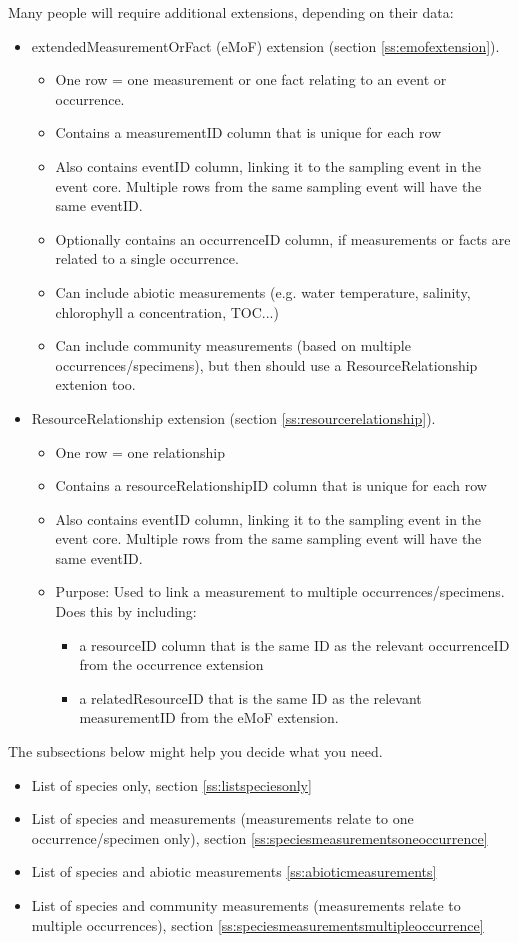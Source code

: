 \documentclass[a4paper,english, 11pt]{article}
\begin{document}
Many people will require additional extensions, depending on their data:

\begin{itemize}
\item extendedMeasurementOrFact (eMoF) extension (section \ref{ss:emofextension}).
\begin{itemize}
\item One row = one measurement or one fact relating to an event or occurrence.
\item Contains a measurementID column that is unique for each row
\item Also contains eventID column, linking it to the sampling event in the event core. Multiple rows from the same sampling event will have the same eventID.
\item Optionally contains an occurrenceID column, if measurements or facts are related to a single occurrence.
\item Can include abiotic measurements (e.g. water temperature, salinity, chlorophyll a concentration, TOC...)
\item Can include community measurements (based on multiple occurrences/specimens), but then should use a ResourceRelationship extenion too. 
\end{itemize}
\item ResourceRelationship extension (section \ref{ss:resourcerelationship}).
\begin{itemize}
\item One row = one relationship
\item Contains a resourceRelationshipID column that is unique for each row
\item Also contains eventID column, linking it to the sampling event in the event core. Multiple rows from the same sampling event will have the same eventID.
\item Purpose: Used to link a measurement to multiple occurrences/specimens. Does this by including:
\begin{itemize}
\item a resourceID column that is the same ID as the relevant occurrenceID from the occurrence extension 
\item a relatedResourceID that is the same ID as the relevant measurementID from the eMoF extension.  
\end{itemize}
\end{itemize}
\end{itemize}

The subsections below might help you decide what you need.
\begin{itemize}
\item List of species only, section \ref{ss:listspeciesonly}
\item List of species and measurements (measurements relate to one occurrence/specimen only), section \ref{ss:speciesmeasurementsoneoccurrence}
\item List of species and abiotic measurements \ref{ss:abioticmeasurements}
\item List of species and community measurements (measurements relate to multiple occurrences), section \ref{ss:speciesmeasurementsmultipleoccurrence}
\end{itemize}
\end{document}
